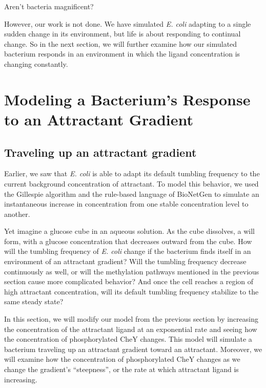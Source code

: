 Aren't bacteria magnificent?

However, our work is not done. We have simulated \textit{E. coli} adapting to a single sudden change in its environment, but life is about responding to continual change. So in the next section, we will further examine how our simulated bacterium responds in an environment in which the ligand concentration is changing constantly.\\


\FloatBarrier
{}

\section{Modeling a Bacterium's Response to an Attractant Gradient}
\label{sec:gradient}

\subsection{Traveling up an attractant gradient}

Earlier, we saw that \textit{E. coli} is able to adapt its default tumbling frequency to the current background concentration of attractant. To model this behavior, we used the Gillespie algorithm and the rule-based language of BioNetGen to simulate an instantaneous increase in concentration from one stable concentration level to another.

Yet imagine a glucose cube in an aqueous solution. As the cube dissolves, a  will form, with a glucose concentration that decreases outward from the cube. How will the tumbling frequency of \textit{E. coli} change if the bacterium finds itself in an environment of an attractant gradient?  Will the tumbling frequency decrease continuously as well, or will the methylation pathways mentioned in the previous section cause more complicated behavior? And once the cell reaches a region of high attractant concentration, will its default tumbling frequency stabilize to the same steady state?

In this section, we will modify our model from the previous section by increasing the concentration of the attractant ligand at an exponential rate and seeing how the concentration of phosphorylated CheY changes. This model will simulate a bacterium traveling up an attractant gradient toward an attractant. Moreover, we will examine how the concentration of phosphorylated CheY changes as we change the gradient's ``steepness'', or the rate at which attractant ligand is increasing.

